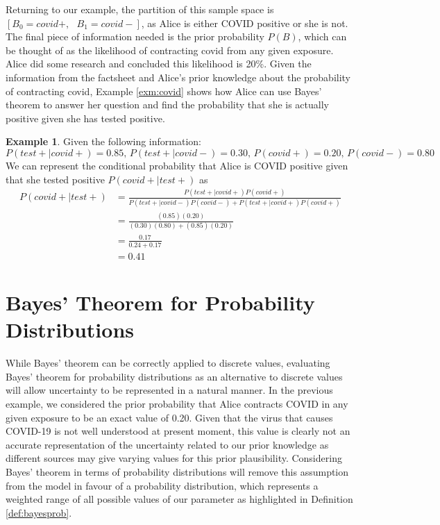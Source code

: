 \documentclass[
  12pt,
]{book}
\theoremstyle{definition}
\theoremstyle{definition}
\newtheorem{example}{Example}[chapter]
\theoremstyle{definition}
\theoremstyle{remark}
\begin{document}
Returning to our example, the partition of this sample space is \([B_{0}=covid+,\textrm{ } B_{1}=covid-]\), as Alice is either COVID positive or she is not.
The final piece of information needed is the prior probability \(P(B)\), which can be thought of as the likelihood of contracting covid from any given exposure.
Alice did some research and concluded this likelihood is 20\%.
Given the information from the factsheet and Alice's prior knowledge about the probability of contracting covid, Example \ref{exm:covid} shows how Alice can use Bayes' theorem to answer her question and find the probability that she is actually positive given she has tested positive.

\begin{example}
\protect\hypertarget{exm:covid}{}{\label{exm:covid} }Given the following information:
\[P(test+|covid+)=0.85 \textrm{, } P(test+|covid-)=0.30 \textrm{, } P(covid+)=0.20 \textrm{, } P(covid-)=0.80\]
We can represent the conditional probability that Alice is COVID positive given that she tested positive \(P(covid+|test+)\) as
\[\begin{split}
P(covid+|test+) & = \frac{P(test+|covid+)P(covid+)}{P(test+|covid-)P(covid-)+P(test+|covid+)P(covid+)}\\
& = \frac{(0.85)(0.20)}{(0.30)(0.80)+(0.85)(0.20)} \\
& = \frac{0.17}{0.24+0.17} \\
& = 0.41
\end{split}\]
\end{example}

\hypertarget{bayes-theorem-for-probability-distributions}{%
\section{Bayes' Theorem for Probability Distributions}\label{bayes-theorem-for-probability-distributions}}

While Bayes' theorem can be correctly applied to discrete values, evaluating Bayes' theorem for probability distributions as an alternative to discrete values will allow uncertainty to be represented in a natural manner.
In the previous example, we considered the prior probability that Alice contracts COVID in any given exposure to be an exact value of 0.20.
Given that the virus that causes COVID-19 is not well understood at present moment, this value is clearly not an accurate representation of the uncertainty related to our prior knowledge as different sources may give varying values for this prior plausibility.
Considering Bayes' theorem in terms of probability distributions will remove this assumption from the model in favour of a probability distribution, which represents a weighted range of all possible values of our parameter as highlighted in Definition \ref{def:bayesprob}.
\end{document}
